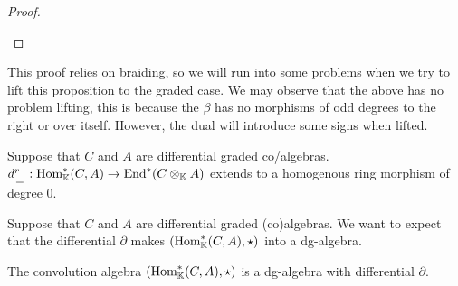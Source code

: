 \documentclass[../thesis.tex]{subfiles}
\begin{document}
\begin{proof}
\begin{center}
                \end{center}
            \end{proof}

            This proof relies on braiding, so we will run into some problems when we try to lift this proposition to the graded case. We may observe that the above has no problem lifting, this is because the $\beta$ has no morphisms of odd degrees to the right or over itself. However, the dual will introduce some signs when lifted.

            \begin{corollary}\label{cor: graded-conv-to-end}
                Suppose that $C$ and $A$ are differential graded co/algebras. $d_{\argument}^r : \tt{Hom}_\mathbb{K}^*(C,A) \rightarrow \tt{End}^*(C\otimes_\mathbb{K} A)$ extends to a homogenous ring morphism of degree $0$.
            \end{corollary}

            Suppose that $C$ and $A$ are differential graded (co)algebras. We want to expect that the differential $\partial$ makes $(\tt{Hom}_\mathbb{K}^*(C,A), \star)$ into a dg-algebra.
            
            \begin{proposition}
                The convolution algebra $(\tt{Hom}_\mathbb{K}^*(C,A),\star)$ is a dg-algebra with differential $\partial$.
            \end{proposition}
\end{document}

